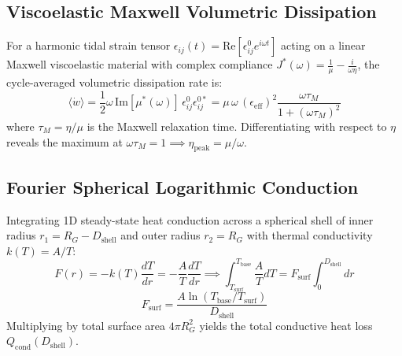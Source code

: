 \documentclass[11pt,a4paper]{article}
\begin{document}
\subsection{Viscoelastic Maxwell Volumetric Dissipation}
For a harmonic tidal strain tensor $\epsilon_{ij}(t) = \text{Re}[\epsilon_{ij}^0 e^{i \omega t}]$ acting on a linear Maxwell viscoelastic material with complex compliance $J^*(\omega) = \frac{1}{\mu} - \frac{i}{\omega \eta}$, the cycle-averaged volumetric dissipation rate is:
\begin{equation}
\langle \dot{w} \rangle = \frac{1}{2} \omega \, \text{Im}[\mu^*(\omega)] \, \epsilon_{ij}^0 \epsilon_{ij}^{0*} = \mu \, \omega \, (\epsilon_{\text{eff}})^2 \frac{\omega \tau_M}{1 + (\omega \tau_M)^2}
\end{equation}
where $\tau_M = \eta / \mu$ is the Maxwell relaxation time. Differentiating with respect to $\eta$ reveals the maximum at $\omega \tau_M = 1 \implies \eta_{\text{peak}} = \mu / \omega$.

\subsection{Fourier Spherical Logarithmic Conduction}
Integrating 1D steady-state heat conduction across a spherical shell of inner radius $r_1 = R_G - D_{\text{shell}}$ and outer radius $r_2 = R_G$ with thermal conductivity $k(T) = A / T$:
\begin{equation}
F(r) = -k(T) \frac{dT}{dr} = -\frac{A}{T} \frac{dT}{dr} \implies \int_{T_{\text{surf}}}^{T_{\text{base}}} \frac{A}{T} dT = F_{\text{surf}} \int_0^{D_{\text{shell}}} dr
\end{equation}
\begin{equation}
F_{\text{surf}} = \frac{A \ln(T_{\text{base}} / T_{\text{surf}})}{D_{\text{shell}}}
\end{equation}
Multiplying by total surface area $4\pi R_G^2$ yields the total conductive heat loss $Q_{\text{cond}}(D_{\text{shell}})$.
\end{document}
